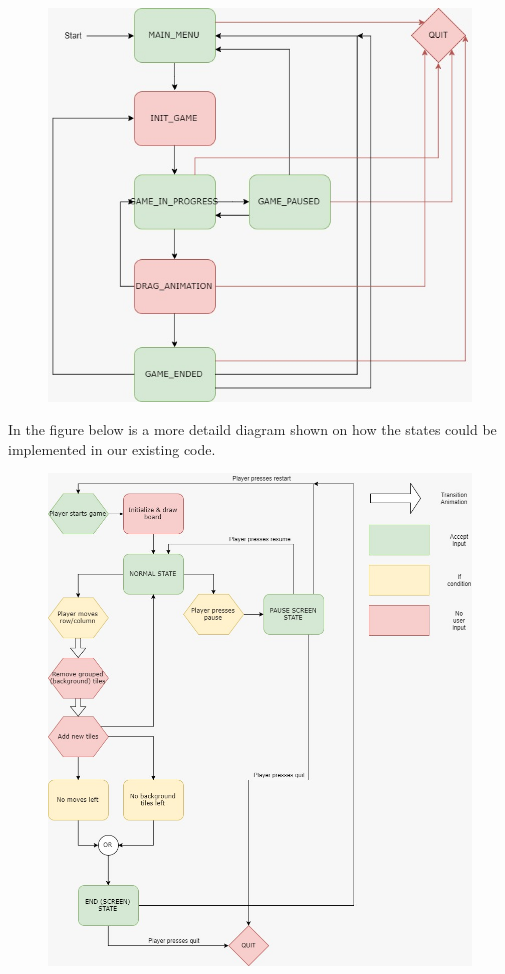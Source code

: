 \documentclass{article}
\begin{document}
\begin{figure}[H]
\includegraphics[scale=0.55]{Images/GameStatesBasic.jpeg}
\end{figure}

In the figure below is a more detaild diagram shown on how the states could be implemented in our existing code.
\begin{figure}[H]
\includegraphics[scale=0.45]{Images/GameStates.jpeg}
\end{figure}
\end{document}

